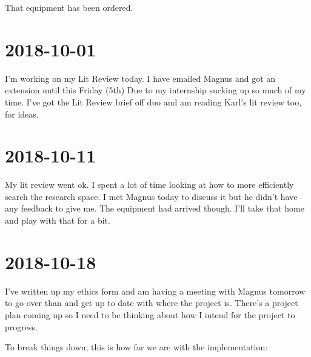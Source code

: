 \documentclass{article}
\begin{document}
	That equipment has been ordered.

	\section{2018-10-01}
	I'm working on my Lit Review today. I have emailed Magnus and got an extension until this Friday (5th) Due to my internship sucking up so much of my time. I've got the Lit Review brief off duo and am reading Karl's lit review too, for ideas.
	
	\section{2018-10-11}
	My lit review went ok. I spent a lot of time looking at how to more efficiently search the research space. I met Magnus today to discuss it but he didn't have any feedback to give me. The equipment had arrived though. I'll take that home and play with that for a bit.
	
	\section{2018-10-18}
	I've written up my ethics form and am having a meeting with Magnus tomorrow to go over than and get up to date with where the project is. There's a project plan coming up so I need to be thinking about how I intend for the project to progress.
	
	To break things down, this is how far we are with the implementation:
	
\end{document}
